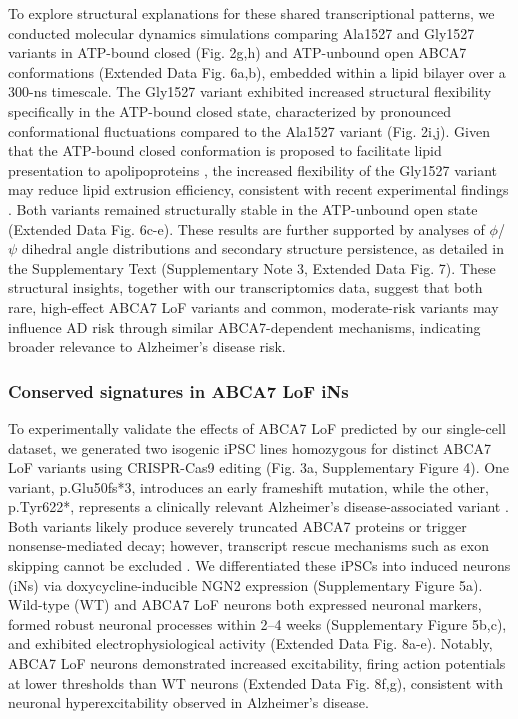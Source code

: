To explore structural explanations for these shared transcriptional patterns, we conducted molecular dynamics simulations comparing Ala1527 and Gly1527 variants in ATP-bound closed (Fig. 2g,h) and ATP-unbound open ABCA7 conformations (Extended Data Fig. 6a,b), embedded within a lipid bilayer over a 300-ns timescale. The Gly1527 variant exhibited increased structural flexibility specifically in the ATP-bound closed state, characterized by pronounced conformational fluctuations compared to the Ala1527 variant (Fig. 2i,j). Given that the ATP-bound closed conformation is proposed to facilitate lipid presentation to apolipoproteins \supercite{LeThiMy2022-dp,Fang2025}, the increased flexibility of the Gly1527 variant may reduce lipid extrusion efficiency, consistent with recent experimental findings \supercite{Fang2025}. Both variants remained structurally stable in the ATP-unbound open state (Extended Data Fig. 6c-e). These results are further supported by analyses of $\phi$/$\psi$ dihedral angle distributions and secondary structure persistence, as detailed in the Supplementary Text (Supplementary Note 3, Extended Data Fig. 7). These structural insights, together with our transcriptomics data, suggest that both rare, high-effect ABCA7 LoF variants and common, moderate-risk variants may influence AD risk through similar ABCA7-dependent mechanisms, indicating broader relevance to Alzheimer's disease risk.

\subsubsection{Conserved signatures in ABCA7 LoF iNs}
To experimentally validate the effects of ABCA7 LoF predicted by our single-cell dataset, we generated two isogenic iPSC lines homozygous for distinct ABCA7 LoF variants using CRISPR-Cas9 editing (Fig. 3a, Supplementary Figure 4). One variant, p.Glu50fs*3, introduces an early frameshift mutation, while the other, p.Tyr622*, represents a clinically relevant Alzheimer's disease-associated variant \supercite{Steinberg2015-mu}. Both variants likely produce severely truncated ABCA7 proteins or trigger nonsense-mediated decay; however, transcript rescue mechanisms such as exon skipping cannot be excluded \supercite{De_Roeck2017-hv}. We differentiated these iPSCs into induced neurons (iNs) via doxycycline-inducible NGN2 expression \supercite{Ho2016-kz} (Supplementary Figure 5a). Wild-type (WT) and ABCA7 LoF neurons both expressed neuronal markers, formed robust neuronal processes within 2–4 weeks (Supplementary Figure 5b,c), and exhibited electrophysiological activity (Extended Data Fig. 8a-e). Notably, ABCA7 LoF neurons demonstrated increased excitability, firing action potentials at lower thresholds than WT neurons (Extended Data Fig. 8f,g), consistent with neuronal hyperexcitability observed in Alzheimer's disease.

